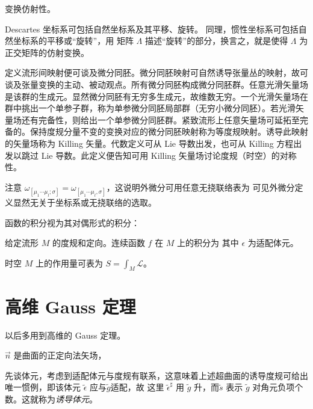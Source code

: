 \begin{theorem}
    变换仿射性。

    Descartes 坐标系可包括自然坐标系及其平移、旋转。
同理，惯性坐标系可包括自然坐标系的平移或“旋转”，用 矩阵 $\Lambda$ 描述“旋转”的部分，换言之，就是使得 $\Lambda$ 为正交矩阵的仿射变换。
\end{theorem}




定义流形间映射便可谈及微分同胚。微分同胚映射可自然诱导张量丛的映射，故可谈及张量变换的主动、被动观点。所有微分同胚构成微分同胚群。任意光滑矢量场是该群的生成元。显然微分同胚有无穷多生成元，故维数无穷。一个光滑矢量场在群中挑出一个单参子群，称为单参微分同胚局部群（无穷小微分同胚）。若光滑矢量场还有完备性，则给出一个单参微分同胚群。紧致流形上任意矢量场可延拓至完备的。保持度规分量不变的变换对应的微分同胚映射称为等度规映射。诱导此映射的矢量场称为 Killing 矢量。代数定义可从 Lie 导数出发，也可从 Killing 方程出发以跳过 Lie 导数。此定义便告知可用 Killing 矢量场讨论度规（时空）的对称性。

\begin{remark}
    注意 $\omega_{[\mu_1\cdots\mu_l;\sigma]}=\omega_{[\mu_1\cdots\mu_l,\sigma]}$，这说明外微分可用任意无挠联络表为
    可见外微分定义显然无关于坐标系或无挠联络的选取。
\end{remark}

函数的积分视为其对偶形式的积分：
\begin{definition}
    给定流形 $M$ 的度规和定向。连续函数 $f$ 在 $M$ 上的积分为
    其中 $\epsilon$ 为适配体元。
\end{definition}
\begin{example}
    时空 $M$ 上的作用量可表为 $S=\int_M\mathcal L$。
\end{example}



\section{高维 Gauss 定理}
以后多用到高维的 Gauss 定理。



$\vec n$ 是曲面的正定向法矢场，


先谈体元，考虑到适配体元与度规有联系，这意味着上述超曲面的诱导度规可给出唯一惯例，即该体元 $\tilde\epsilon$ 应与$\tilde g$适配，故
这里 $\tilde\epsilon^\sharp$ 用 $\tilde g$ 升，而$\tilde s$ 表示 $\tilde g$ 对角元负项个数。这就称为\textit{诱导体元}。

